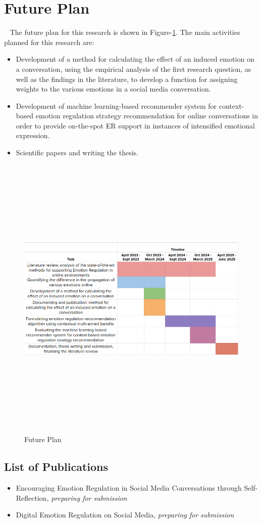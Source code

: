 \newpage 
\section{Future Plan}~\label{sec:discussion}
The future plan for this research is shown in Figure-\ref{fig:plan}. The main activities planned for this research are:
\begin{itemize}
    \item Development of a method for calculating the effect of an induced emotion on a conversation, using the empirical analysis of the first research question, as well as the findings in the literature, to develop a function for assigning weights to the various emotions in a social media conversation.
    \item Development of machine learning-based recommender system for context-based emotion regulation strategy recommendation for online conversations in order to provide on-the-spot ER support in instances of intensified emotional expression.
    \item Scientific papers and writing the thesis.
\end{itemize}
\begin{figure}[h]
  
    \centering
    \includegraphics[width=14cm,height=14cm,keepaspectratio]{plan.png}
  \caption{Future Plan}
  \label{fig:plan}
  \end{figure} 


  
\subsection{List of Publications}
\begin{itemize}
    \item Encouraging Emotion Regulation in Social Media Conversations through Self-Reflection, \textit{preparing for submission}
    \item Digital Emotion Regulation on Social Media, \textit{preparing for submission}
\end{itemize}


